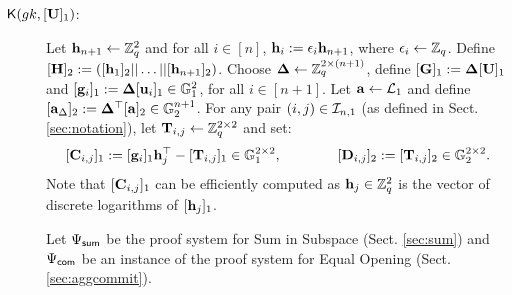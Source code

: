 \begin{description} \label{bits-proof-system}


\item[$\mathsf{K}({gk}, {[\mathbf{{U}}]_1})$:]
Let $\mathbf{h}_{n+1}\gets \mathbb{Z}_q^2$
and for all $i \in [n]$, $\mathbf{h}_{i}:=\epsilon_{i}\mathbf{h}_{n+1}$, where
$\epsilon_{i} \leftarrow \mathbb{Z}_q$. Define
$[{\mathbf{{H}}}]_2 := ([\mathbf{h}_1]_2|| \ldots ||[\mathbf{h}_{n+1}]_2)$.
Choose 
$\mathbf{{\Delta}} \leftarrow \mathbb{Z}_q^{2 \times (n+1)}$,
define $[\mathbf{{G}}]_1 := \mathbf{{\Delta}}[\mathbf{{U}}]_1$
and $[\mathbf{g}_{i}]_1:=\mathbf{{\Delta}} [\mathbf{u}_i]_1 \in \mathbb{G}_1^2$, for all $i \in [n+1]$. 
Let $\mathbf{a} \leftarrow \mathcal{L}_{1}$ and define $[\mathbf{a}_{\Delta}]_2:=\mathbf{{\Delta}}^\top[\mathbf{a}]_2 \in \mathbb{G}_2^{n+1}$. 
For any pair $(i,j) \in \mathcal{I}_{n,1}$ (as defined in Sect. \ref{sec:notation}), let 
$\mathbf{{T}}_{i,j}\gets\mathbb{Z}_q^{2\times2}$ and set:
$$[\mathbf{{C}}_{i,j}]_1:=[\mathbf{g}_i]_1 \mathbf{h}_j^{\top} - [\mathbf{{T}}_{i,j}]_1  \in \mathbb{G}_1^{2 \times 2},
\qquad \qquad 
[\mathbf{{D}}_{i,j}]_2:=[\mathbf{{T}}_{i,j}]_2 \in \mathbb{G}_2^{2 \times 2}.$$ 
Note that $[\mathbf{{C}}_{i,j}]_1$ can be efficiently computed 
as $\mathbf{h}_j \in \mathbb{Z}_q^{2}$ is the vector of discrete logarithms of $[\mathbf{h}_j]_1$.

Let ${\Psi_{\mathsf{sum}}}$ be the proof system for Sum in Subspace 
(Sect. \ref{sec:sum}) and ${\Psi_{\mathsf{com}}}$
be an instance of the proof system for Equal Opening (Sect. \ref{sec:aggcommit}).


\end{description}
